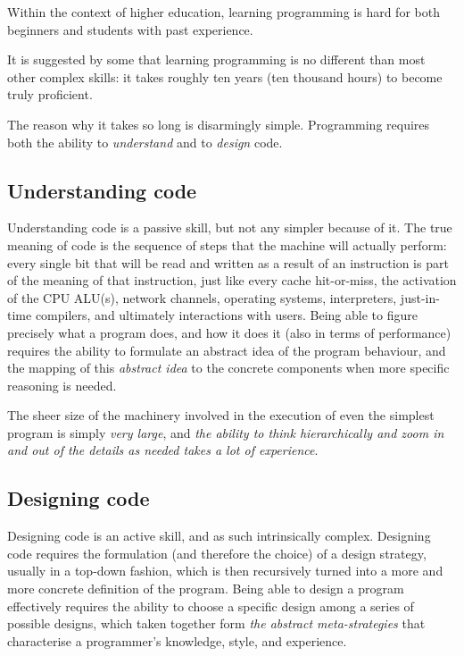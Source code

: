Within the context of higher education, learning programming is hard for both beginners and students with past experience. 

It is suggested by some \cite{tan2009learning} that learning programming is no different than most other complex skills: it takes roughly ten years (ten thousand hours) to become truly proficient.

The reason why it takes so long is disarmingly simple. Programming requires both the ability to \textit{understand} and to \textit{design} code. 

\subsection{Understanding code}
Understanding code is a passive skill, but not any simpler because of it. The true meaning of code is the sequence of steps that the machine will actually perform: every single bit that will be read and written as a result of an instruction is part of the meaning of that instruction, just like every cache hit-or-miss, the activation of the CPU ALU(s), network channels, operating systems, interpreters, just-in-time compilers, and ultimately interactions with users. Being able to figure precisely what a program does, and how it does it (also in terms of performance) requires the ability to formulate an abstract idea of the program behaviour, and the mapping of this \textit{abstract idea} to the concrete components when more specific reasoning is needed.

The sheer size of the machinery involved in the execution of even the simplest program is simply \textit{very large}, and \textit{the ability to think hierarchically and zoom in and out of the details as needed takes a lot of experience}.

\subsection{Designing code}
Designing code is an active skill, and as such intrinsically complex. Designing code requires the formulation (and therefore the choice) of a design strategy, usually in a top-down fashion, which is then recursively turned into a more and more concrete definition of the program. Being able to design a program effectively requires the ability to choose a specific design among a series of possible designs, which taken together form \textit{the abstract meta-strategies} that characterise a programmer’s knowledge, style, and experience.

